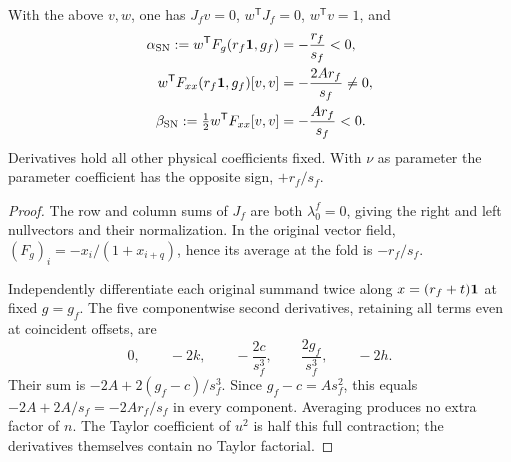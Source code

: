 \begin{proposition}
\label{prop:P10-coefficients}
With the above $v,w$, one has $J_fv=0$, $w^{\mathsf T}J_f=0$,
$w^{\mathsf T}v=1$, and
\begin{align}
 \alpha_{\rm SN}:=w^{\mathsf T}F_g(r_f\mathbf{1},g_f)
 &=-\frac{r_f}{s_f}<0,\label{eq:P10-alpha}\\
 w^{\mathsf T}F_{xx}(r_f\mathbf{1},g_f)[v,v]
 &=-\frac{2Ar_f}{s_f}\ne0,\label{eq:P10-contraction}\\
 \beta_{\rm SN}:=\tfrac12w^{\mathsf T}F_{xx}[v,v]
 &=-\frac{Ar_f}{s_f}<0.\label{eq:P10-beta}
\end{align}
Derivatives hold all other physical coefficients fixed. With $\nu$
as parameter the parameter coefficient has the opposite sign,
$+r_f/s_f$.
\end{proposition}
\begin{proof}
The row and column sums of $J_f$ are both $\lambda_0^f=0$, giving
the right and left nullvectors and their normalization. In the original
vector field, $(F_g)_i=-x_i/(1+x_{i+q})$, hence its average at the
fold is $-r_f/s_f$.

Independently differentiate each original summand twice along
$x=(r_f+t)\mathbf{1}$ at fixed $g=g_f$. The five componentwise second
derivatives, retaining all terms even at coincident offsets, are
\[
 0,\qquad -2k,\qquad -\frac{2c}{s_f^3},\qquad
 \frac{2g_f}{s_f^3},\qquad -2h.
\]
Their sum is $-2A+2(g_f-c)/s_f^3$. Since $g_f-c=A s_f^2$,
this equals $-2A+2A/s_f=-2Ar_f/s_f$ in every component.
Averaging produces no extra factor of $n$. The Taylor coefficient
of $u^2$ is half this full contraction; the derivatives themselves
contain no Taylor factorial.
\end{proof}

